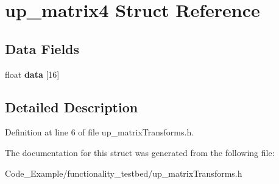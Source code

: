 \hypertarget{structup__matrix4}{}\section{up\+\_\+matrix4 Struct Reference}
\label{structup__matrix4}
\subsection*{Data Fields}
\begin{DoxyCompactItemize}
\item 
\hypertarget{structup__matrix4_a31244897a6c7f657a9aec807dd1e09ae}{}float {\bfseries data} \mbox{[}16\mbox{]}\label{structup__matrix4_a31244897a6c7f657a9aec807dd1e09ae}

\end{DoxyCompactItemize}


\subsection{Detailed Description}


Definition at line 6 of file up\+\_\+matrix\+Transforms.\+h.



The documentation for this struct was generated from the following file\+:\begin{DoxyCompactItemize}
\item 
Code\+\_\+\+Example/functionality\+\_\+testbed/up\+\_\+matrix\+Transforms.\+h\end{DoxyCompactItemize}
